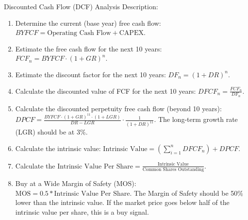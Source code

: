 Discounted Cash Flow (DCF) Analysis Description:
\begin{enumerate}
	\item Determine the current (base year) free cash flow: $BYFCF = \text{Operating Cash Flow} + \text{CAPEX}$.
    \item Estimate the free cash flow for the next 10 years: $FCF_n = BYFCF \cdot {(1+GR)}^n$.
    \item Estimate the discount factor for the next 10 years: $DF_n = {(1+DR)}^n$.
	\item Calculate the discounted value of FCF for the next 10 years: $DFCF_n = \frac{FCF_n}{DF_n}$.
	\item Calculate the discounted perpetuity free cash flow (beyond 10 years):
        $DPCF = \frac{BYFCF \cdot {(1+GR)}^{11} \cdot (1+LGR)}{DR-LGR} \cdot \frac{1}{{(1+DR)}^{11}}$.
	The long-term growth rate (LGR) should be at 3\%.
	\item Calculate the intrinsic value: $\text{Intrinsic Value} = (\sum_{i=1}^n DFCF_n) + DPCF$.
	\item Calculate the $\text{Intrinsic Value Per Share} = \frac{\text{Intrinsic Value}}{\text{Common Shares Outstanding}}$.
    \item Buy at a Wide Margin of Safety (MOS): $\text{MOS} = 0.5 * \text{Intrinsic Value Per Share}$.
        The Margin of Safety should be 50\% lower than the intrinsic value. If 
        the market price goes below half of the intrinsic value per share, this 
        is a buy signal.\\
\end{enumerate}

